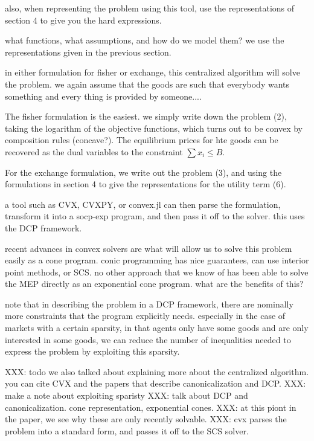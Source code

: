 \documentclass[12pt]{article}
\begin{document}
also, when representing the problem using this tool, use
the representations of section 4 to give you the hard expressions.



what functions, what assumptions, and how do we model them? we use the 
representations given in the previous section.

in either formulation for fisher or exchange, this centralized algorithm will
solve the problem. we again assume that the goods are such that everybody wants
something and every thing is provided by someone....


The fisher formulation is the easiest. we simply write down the problem (2),
taking the logarithm of the objective functions, which turns out to be convex
by composition rules (concave?). The equilibrium prices for hte goods can 
be recovered as the dual variables to the constraint $\sum x_i \leq B$.

For the exchange formulation, we write out the problem (3), and using the
formulations in section 4 to give the representations for the 
utility term (6).

a tool such as CVX, CVXPY, or convex.jl can then parse the formulation,
transform it into a socp-exp program, and then pass it off to the solver.
this uses the DCP framework.

recent advances in convex solvers are what will allow us to solve this problem
easily as a cone program. conic programming has nice guarantees, 
can use interior point methods, or SCS. no other approach that we know of
has been able to solve the MEP directly as an exponential cone program. 
what are the benefits of this?

note that in describing the problem in a DCP framework, there are nominally
more constraints that the program explicitly needs. especially in the case
of markets with a certain sparsity, in that agents only have some goods
and are only interested in some goods, we can reduce the number of inequalities
needed to express the problem by exploiting this sparsity.


XXX: todo we also talked about explaining more about the centralized algorithm.    you
can cite CVX and the papers that describe canonicalization and DCP.
XXX: make a note about exploiting sparisty
XXX: talk about DCP and canonicalization. cone representation, exponential cones.
XXX: at this piont in the paper, we see why these are only recently solvable.
XXX: cvx parses the problem into a standard form, and passes it off to the SCS
solver.
\end{document}

